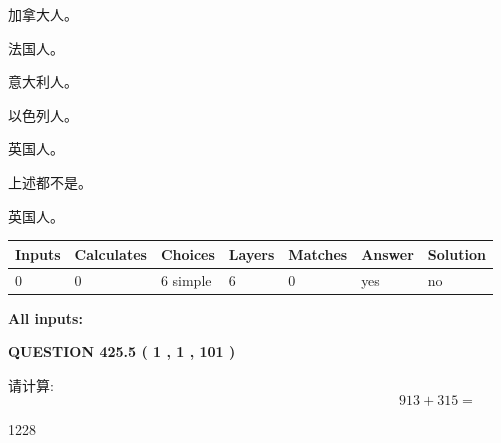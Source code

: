 \documentclass{ctexart}
\begin{document}
 
加拿大人。
 
 
法国人。
 
 
意大利人。
 
 
以色列人。
 
 
英国人。
 
 
 上述都不是。
 
 
\noindent{}
 
 
英国人。
 
 
\noindent{}
 
 
   
   
   
   
\noindent\begin{tabular}{|l|l|l|l|l|l|l|}
 \hline
Inputs & Calculates & Choices & Layers & Matches & Answer & Solution \\ \hline
 0  & 
 0  & 
 6
  simple  
  & 
 6  & 
 0  & 
  yes & 
  no 
  \\ \hline
 \end{tabular}
   
   
   
   
\noindent{}
   
   
   
   
\noindent\vspace{0.1in}\hspace{-0.08in} {\textbf{\Large{All inputs: }}}
   
   
  
\vspace{0.2in}
  
{\textbf{\Large{QUESTION
425.5 
 ( 1 , 1 , 101 )
}}}
  
  
 
请计算:
\begin{equation}
913 +  %
315 = \nonumber
\end{equation}
 
 
 
\noindent{}
 
 

1228
 
\end{document}

